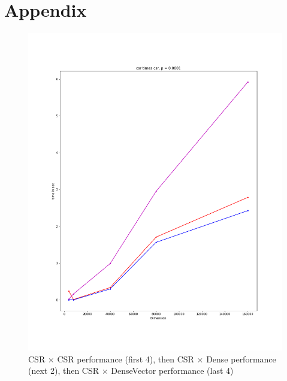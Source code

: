 \documentclass[12pt]{article}
\begin{document}



\section{Appendix} \label{appendix}

\newpage 

\begin{figure}[h]
  \caption{CSR $\times$ CSR performance (first 4), then CSR $\times$ Dense performance (next 2), then CSR $\times$ DenseVector performance (last 4) }
  \includegraphics[scale = 0.16]{csr_csr_0001.PNG}

\end{figure}
\end{document}
